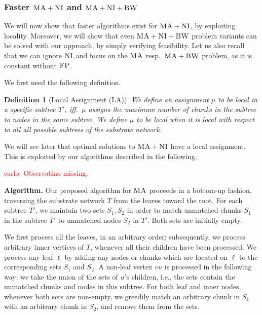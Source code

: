 \documentclass[9pt]{sigcomm-alternate}
\newcommand{\carlo}[1]{\textcolor{red}{carlo: #1}}
\newcommand{\VmChunkAssignment}{\mu}
\newcommand{\CC}{\textsc{NI}}
\newcommand{\FP}{\textsc{FP}}
\newcommand{\BW}{\textsc{BW}}
\newcommand{\MA}{\textsc{MA}}
\newtheorem{defn}{Definition}
\newcommand{\Tree}{\ensuremath{T}}
\begin{document}
\subsubsection{Faster $\MA+\CC$ and $\MA+\CC+\BW$}

We will now show that faster algorithms exist for $\MA+\CC$, by exploiting
locality. Moreover, we will show that
even
$\MA+\CC+\BW$ problem variants can be solved with our approach, by simply
verifying feasibility.
Let us also recall that we can ignore $\CC$ and focus on the $\MA$ resp.~$\MA+\BW$ problem, 
as it is constant
without $\FP$.

We first need the following definition.
\begin{defn}[Local Assignment (LA)]\label{def:loc}
We define an assignment $\VmChunkAssignment$ to
be \emph{local in a specific subtree $\Tree'$}, iff.~$\VmChunkAssignment$
assigns the maximum number of chunks in the
subtree to nodes in the same subtree.
We define $\VmChunkAssignment$ to be \emph{local} when
it is local with respect to all all possible subtrees of the substrate network.
\end{defn}

We will see later that 
optimal solutions to
$\MA+\CC$ have a local assignment. This is exploited by our algorithms described 
in the following.

\carlo{Observatino missing.}

\textbf{Algorithm.} Our proposed algorithm for $\MA$ 
proceeds in a bottom-up fashion, traversing the substrate network $\Tree$
from the leaves toward the root.
For each subtree $\Tree'$, we maintain
two sets $S_1,S_2$ in order to match unmatched
chunks $S_1$ in the subtree $\Tree'$ to unmatched 
nodes $S_2$ in $\Tree'$. Both sets are initially empty.

We first process all the leaves, in an arbitrary order; subsequently, we process arbitrary inner vertices
of $\Tree$, whenever all their children have been processed. 
We process any leaf $\ell$
by adding any
nodes or chunks which are located on $\ell$ to the corresponding sets $S_1$ and $S_2$. 
A non-leaf vertex $vu$ is processed in the following way: we take the union of
the sets of $u$'s children, i.e., the sets contain the unmatched chunks and nodes
in this subtree. 
For both leaf and inner nodes, whenever
both sets are non-empty, we greedily match an arbitrary chunk in $S_1$ with an arbitrary chunk in $S_2$,
and remove them from the sets.
\end{document}
